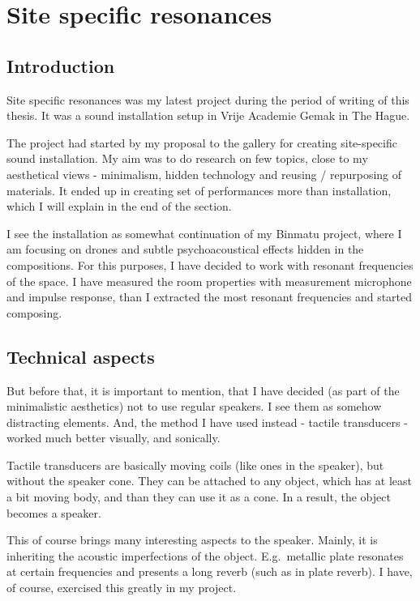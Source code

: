 \documentclass[12pt,a4paper,oneside]{report}
\begin{document}
\clearpage
\section{Site specific resonances}
\subsection{Introduction}
Site specific resonances was my latest project during the period of writing of this thesis. It was a sound installation setup in Vrije Academie Gemak in The Hague.

The project had started by my proposal to the gallery for creating site-specific sound installation. My aim was to do research on few topics, close to my aesthetical views - minimalism, hidden technology and reusing / repurposing of materials. It ended up in creating set of performances more than installation, which I will explain in the end of the section.

I see the installation as somewhat continuation of my Binmatu project, where I am focusing on drones and subtle psychoacoustical effects hidden in the compositions. For this purposes, I have decided to work with resonant frequencies of the space. I have measured the room properties with measurement microphone and impulse response, than I extracted the most resonant frequencies and started composing.

\subsection{Technical aspects}

But before that, it is important to mention, that I have decided (as part of the minimalistic aesthetics) not to use regular speakers. I see them as somehow distracting elements. And, the method I have used instead - tactile transducers - worked much better visually, and sonically.

Tactile transducers are basically moving coils (like ones in the speaker), but without the speaker cone. They can be attached to any object, which has at least a bit moving body, and than they can use it as a cone. In a result, the object becomes a speaker. 

This of course brings many interesting aspects to the speaker. Mainly, it is inheriting the acoustic imperfections of the object. E.g.\ metallic plate resonates at certain frequencies and presents a long reverb (such as in plate reverb). I have, of course, exercised this greatly in my project.
\end{document}

